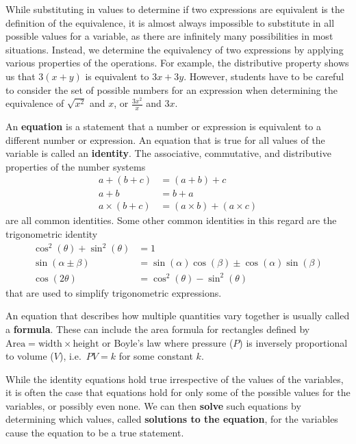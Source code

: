 \documentclass[
]{book}
\theoremstyle{definition}
\theoremstyle{definition}
\theoremstyle{definition}
\theoremstyle{definition}
\theoremstyle{remark}
\begin{document}
While substituting in values to determine if two expressions are equivalent is the definition of the equivalence, it is almost always impossible to substitute in all possible values for a variable, as there are infinitely many possibilities in most situations. Instead, we determine the equivalency of two expressions by applying various properties of the operations. For example, the distributive property shows us that \(3(x+y)\) is equivalent to \(3x+3y\). However, students have to be careful to consider the set of possible numbers for an expression when determining the equivalence of \(\sqrt{x^2}\) and \(x\), or \(\frac{3x^2}{x}\) and \(3x\).

An \textbf{equation} is a statement that a number or expression is equivalent to a different number or expression. An equation that is true for all values of the variable is called an \textbf{identity}. The associative, commutative, and distributive properties of the number systems
\begin{align*}
    a+(b+c) &= (a+b)+c \\
    a+b &= b+a \\
    a \times (b+c) &= (a\times b)+(a\times c)
\end{align*}
are all common identities. Some other common identities in this regard are the trigonometric identity
\begin{align*}
    \cos^2(\theta) + \sin^2(\theta) &= 1  \\
    \sin(\alpha \pm \beta) &= \sin(\alpha)\cos(\beta)\pm \cos(\alpha)\sin(\beta) \\
    \cos(2\theta) &= \cos^2(\theta)-\sin^2(\theta)
\end{align*}
that are used to simplify trigonometric expressions.

An equation that describes how multiple quantities vary together is usually called a \textbf{formula}. These can include the area formula for rectangles defined by \(\mbox{Area}=\mbox{width} \times \mbox{height}\) or Boyle's law where pressure (\(P\)) is inversely proportional to volume (\(V\)), i.e.~\(PV =k\) for some constant \(k\).

While the identity equations hold true irrespective of the values of the variables, it is often the case that equations hold for only some of the possible values for the variables, or possibly even none. We can then \textbf{solve} such equations by determining which values, called \textbf{solutions to the equation}, for the variables cause the equation to be a true statement.
\end{document}
